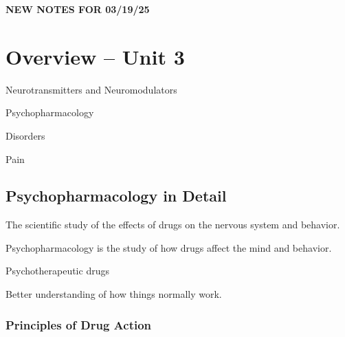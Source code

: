 \begin{center}
    \textbf{NEW NOTES FOR 03/19/25} \\
    \hrulefill
\end{center}

\section{Overview -- Unit 3}

\begin{coloredlist}
    \item Neurotransmitters and Neuromodulators
    \begin{coloredlist}
        \item Psychopharmacology
        \item Disorders
        \item Pain
    \end{coloredlist}
\end{coloredlist}

\subsection{Psychopharmacology in Detail}

\begin{coloredlist}
    \item The scientific study of the effects of drugs on the nervous system and behavior.
    \item Psychopharmacology is the study of how drugs affect the mind and behavior.
    \begin{coloredlist}
        \item Psychotherapeutic drugs
        \item Better understanding of how things normally work.
    \end{coloredlist}
\end{coloredlist}

\subsubsection{Principles of Drug Action}

